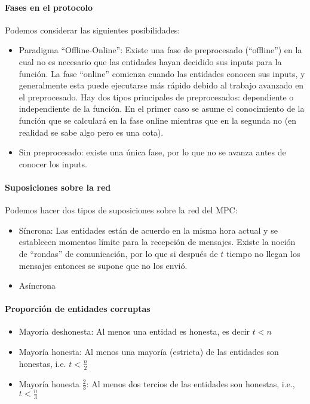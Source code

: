   \paragraph{Fases en el protocolo}
  Podemos considerar las siguientes posibilidades:
  \begin{itemize}
    \item Paradigma ``Offline-Online'': Existe una fase de preprocesado (``offline'') en la cual no es 
      necesario que las entidades hayan decidido sus inputs para la función.
      La fase ``online'' comienza cuando las entidades conocen sus inputs, y generalmente esta puede 
      ejecutarse más rápido debido al trabajo avanzado en el preprocesado.
      Hay dos tipos principales de preprocesados: dependiente o independiente de la función.
      En el primer caso se asume el conocimiento de la función que se calculará en la fase online mientras
      que en la segunda no (en realidad se sabe algo pero es una cota).
    \item Sin preprocesado: existe una única fase, por lo que no se avanza antes de conocer los inputs.
  \end{itemize}

  \paragraph{Suposiciones sobre la red}
  Podemos hacer dos tipos de suposiciones sobre la red del MPC:
  \begin{itemize}
    \item Síncrona: Las entidades están de acuerdo en la misma hora actual y se establecen 
      momentos límite para la recepción de mensajes.
      Existe la noción de ``rondas'' de comunicación, por lo que si después de $t$ tiempo no 
      llegan los mensajes entonces se supone que no los envió.
    \item Asíncrona
  \end{itemize}

  \paragraph{Proporción de entidades corruptas}
  \begin{itemize}
    \item Mayoría deshonesta: Al menos una entidad es honesta, es decir $t < n$
    \item Mayoría honesta: Al menos una mayoría (estricta) de las entidades son honestas,
      i.e. $t < \frac{n}{2}$
    \item Mayoría honesta $\frac{2}{3}$: Al menos dos tercios de las entidades son honestas, i.e., $t < \frac{n}{3}$
  \end{itemize}

